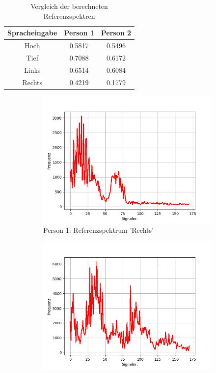 \documentclass[12pt, oneside, a4paper, \docLanguage]{report}
\begin{document}
\begin{table}[H]
	\centering\small
	\begin{tabular}{||c | c | c||}
		 \hline
		 Spracheingabe & Person 1 & Person 2 \\ [0.5ex] 
		 \hline
		 Hoch & 0.5817 & 0.5496 \\ 
		 \hline
		 Tief & 0.7088 & 0.6172 \\
		 \hline
		 Links & 0.6514 & 0.6084 \\
		 \hline
		 Rechts & 0.4219 & 0.1779 \\
		 \hline
	\end{tabular}
	\caption{Vergleich der berechneten Referenzspektren}
	\label{fig:Vergleich der berechneten Referenzspektren}
\end{table}

\begin{figure}[H]
\centering
	\begin{subfigure}{.5\textwidth}
  		\centering
 		 \includegraphics[width=.95\linewidth]{../data/img/Versuch2/2Averagerechts.png}
  		\caption{Person 1: Referenzspektrum 'Rechts'}
 		 \label{fig:sub1}
	\end{subfigure}%
	\begin{subfigure}{.5\textwidth}
  		\centering
 		 \includegraphics[width=.95\linewidth]{../data/img/Versuch2/Averagerechts.png}

\end{subfigure}
\end{figure}
\end{document}
